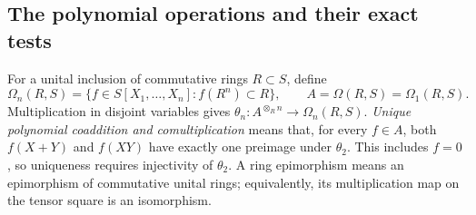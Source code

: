 \documentclass[11pt,a4paper]{article}
\theoremstyle{definition}
\begin{document}
\subsection{The polynomial operations and their exact tests}
For a unital inclusion of commutative rings $R\subset S$, define
\[
 \Omega_n(R,S)=\{f\in S[X_1,\ldots,X_n]:f(R^n)\subset R\},
 \qquad A=\Omega(R,S)=\Omega_1(R,S).
\]
Multiplication in disjoint variables gives
$\theta_n:A^{\otimes_R n}\to\Omega_n(R,S)$.
\emph{Unique polynomial coaddition and comultiplication} means that,
for every $f\in A$, both $f(X+Y)$ and $f(XY)$ have exactly one preimage
under $\theta_2$. This includes $f=0$, so uniqueness requires
injectivity of $\theta_2$. A ring epimorphism means an epimorphism of
commutative unital rings; equivalently, its multiplication map on the
tensor square is an isomorphism.
\end{document}
